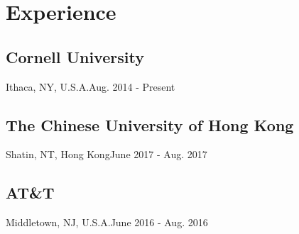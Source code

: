 \section{Experience}
\iffalse
\subsection{California Institute of Technology}{Pasadena, CA, U.S.A.}{Oct. 2018 - Present}
\content{
\position{Posdoctoral Scholar}
\bulletitem{Lead the project of freshness-driven network control.}
\bulletitem{Developed generic solver for unconstrained control problems.}
\bulletitem{Investigated perseverance-aware rate adaptive networks.}
}\\
\fi
\subsection{Cornell University}{Ithaca, NY, U.S.A.}{Aug. 2014  - Present}%
\\
\subsection{The Chinese University of Hong Kong}{Shatin, NT, Hong Kong}{June 2017 - Aug. 2017}
\\
\subsection{AT\&T}{Middletown, NJ, U.S.A.}{June 2016  - Aug. 2016}
\vspace*{0.1cm}

\iffalse
\subsection{Army, Republic of China Armed Forces}{Taipei, Taiwan}{Aug. 2012  - July 2013}
\content{
\position{Chief Counselor, Second Lieutenant}
\bulletitem{Chief political warfare manager of a company.}
}\vspace*{0.1cm}
\fi